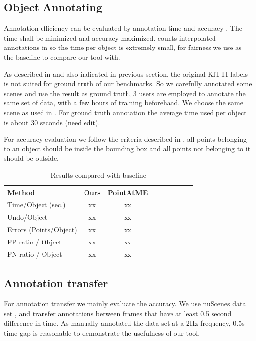 \documentclass[letterpaper, 10 pt, conference]{ieeeconf}  %
\begin{document}
\subsection{Object Annotating}

Annotation efficiency can be evaluated by annotation time and accuracy\cite{pointatme} \cite{Zimmer20193DBA}. The time shall be minimized and accuracy maximized. \cite{Zimmer20193DBA} counts interpolated annotations in so the time per object is extremely small, for fairness we use \cite{pointatme} as the baseline to compare our tool with.

As described in \cite{pointatme} and also indicated in previous section, the original KITTI labels is not suited for ground truth of our benchmarks. So we carefully annotated some scenes and use the result as ground truth, 3 users are employed to annotate the same set of data, with a few hours of training beforehand. We choose the same scene as used in \cite{pointatme}. For ground truth annotation the average time used per object is about 30 seconds (need edit).

For accuracy evaluation we follow the criteria  described in \cite{pointatme}, all points belonging to an object should be inside the bounding box and all points not belonging to it should be outside.

\begin{table}[h]
	\centering
	\caption{Results compared with baseline}
	\label{tab:metrics}
	\begin{tabular}{|l|c|c|c|c||c|c|c|c|}
		\hline
		\textbf{Method} & \textbf{Ours} & \textbf{PointAtME\cite{pointatme}} \\
		\hline
		\hline
		Time/Object (sec.) & xx & xx\\
		\hline
		Undo/Object & xx & xx\\
		\hline
		Errors (Points/Object) & xx & xx\\
		\hline
		FP ratio / Object & xx & xx\\
		\hline
		FN ratio / Object & xx & xx\\
		\hline
	\end{tabular}
\end{table}


\subsection{Annotation transfer}
For annotation transfer we mainly evaluate the accuracy. We use nuScenes data set \cite{Caesar2019nuScenesAM}, and transfer annotations between frames that have at least 0.5 second difference in time. As \cite{Caesar2019nuScenesAM} \cite{Patil2019TheHD} manually annotated the data set at a 2Hz frequency, 0.5s time gap is reasonable to demonstrate the usefulness of our tool.
\end{document}
